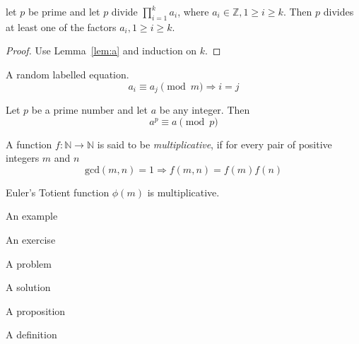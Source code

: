\begin{corollary}
let $p$ be prime and let $p$ divide $\prod_{i=1}^{k}a_{i}$, where $a_{i}\in\mathbb{Z}, 1\geq i\geq k$. Then $p$ divides at least one of the factors $a_{i}, 1\geq i\geq k$.
\end{corollary}

\begin{proof}
Use Lemma~\ref{lem:a} and induction on $k$.
\end{proof}

\noindent
A random labelled equation.
\begin{equation}\label{eq:a}
a_{i}\equiv a_{j} \pmod{m}\Rightarrow i=j
\end{equation}

\begin{theorem}
Let $p$ be a prime number and let $a$ be any integer. Then
\[
a^{p}\equiv a\pmod{p}
\]
\end{theorem}

\begin{definition}
A function $f:\mathbb{N}\rightarrow\mathbb{N}$ is said to be \emph{multiplicative}, if for every pair of positive integers $m$ and $n$
\[
\mathrm{gcd}(m,n)=1\Rightarrow f(m,n)=f(m)f(n)
\]
\end{definition}

\begin{lemma}
Euler's Totient function $\phi(m)$ is multiplicative.
\end{lemma}

\begin{example}
An example
\end{example}

\begin{exercise}
An exercise
\end{exercise}

\begin{problem}
A problem
\end{problem}

\begin{solution}
A solution
\end{solution}

\begin{proposition}
A proposition
\end{proposition}


\begin{definition}
A definition
\end{definition}

\begin{note}
\lipsum[1]
\end{note}


